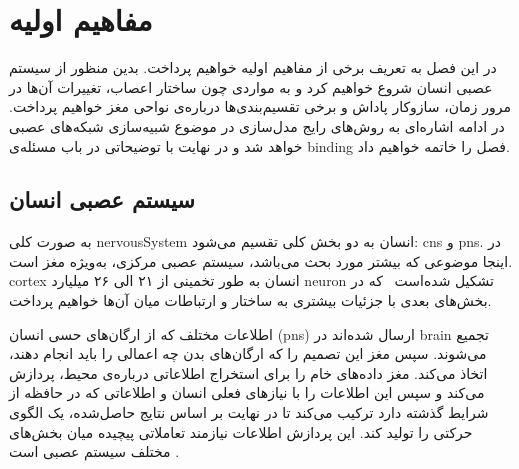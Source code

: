 \documentclass[12pt]{report}
\begin{document}
	
	
	
	\tableofcontents
	
	
	
	\chapter{مفاهیم اولیه}
	\label{ch:Defs}
	\pagestyle{plain}
	\setcounter{page}{1}
	
	در این فصل به تعریف برخی از مفاهیم اولیه خواهیم پرداخت. بدین منظور از سیستم عصبی انسان شروع خواهیم کرد و به مواردی چون ساختار اعصاب، تغییرات آن‌ها در مرور زمان، سازوکار پاداش و برخی تقسیم‌بندی‌ها درباره‌ی نواحی مغز خواهیم پرداخت. در ادامه اشاره‌ای به روش‌‌های رایج مدل‌سازی در موضوع شبیه‌سازی شبکه‌های عصبی خواهد شد و در نهایت با توضیحاتی در باب مسئله‌ی \gls{binding} فصل را خاتمه خواهیم داد.
	
	\section{سیستم عصبی انسان}
	
	به صورت کلی \gls{nervousSystem} انسان به دو بخش کلی تقسیم می‌شود: \gls{cns}
	و \gls{pns}.
	در اینجا موضوعی که بیشتر مورد بحث می‌باشد، سیستم عصبی مرکزی، به‌ویژه مغز است. \gls{cortex} انسان به طور تخمینی از ۲۱ الی ۲۶ میلیارد \gls{neuron} تشکیل شده‌است~\cite{Pelvig2008-vh}
	که در بخش‌های بعدی با جزئیات بیشتری به ساختار و ارتباطات میان آن‌ها خواهیم پرداخت.
	
	
	اطلاعات مختلف که از ارگان‌های حسی انسان (\gls{pns}) ارسال شده‌اند در \gls{brain} تجمیع می‌شوند. سپس مغز این تصمیم را که ارگان‌های بدن چه اعمالی را باید انجام دهند، اتخاذ می‌کند. مغز داده‌های خام را برای استخراج اطلاعاتی درباره‌ی محیط، پردازش می‌کند و سپس این اطلاعات را با نیاز‌های فعلی انسان و اطلاعاتی که در حافظه از شرایط گذشته دارد ترکیب می‌کند تا در نهایت بر اساس نتایج حاصل‌شده، یک الگوی حرکتی را تولید ‌کند. این پردازش اطلاعات نیازمند تعاملاتی پیچیده میان بخش‌های مختلف سیستم عصبی است 
	\cite{carew2000}.
	
\end{document}
